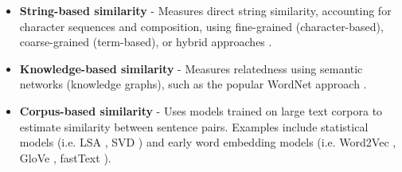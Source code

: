\documentclass[10pt,oneside]{report}
\begin{document}
\begin{itemize}
    \item \textbf{String-based similarity} - Measures direct string similarity, accounting for character sequences and composition, using fine-grained (character-based), coarse-grained (term-based), or hybrid approaches \cite{yu2016string}.
    \item \textbf{Knowledge-based similarity} - Measures relatedness using semantic networks (knowledge graphs), such as the popular WordNet approach \cite{budanitsky2001semantic}.
    \item \textbf{Corpus-based similarity} - Uses models trained on large text corpora to estimate similarity between sentence pairs. Examples include statistical models (i.e. LSA \cite{landauer1998introduction}, SVD \cite{steinberger2005text}) and early word embedding models (i.e. Word2Vec \cite{bojanowski2017enriching}, GloVe \cite{pennington2014glove}, fastText \cite{mikolov2013efficient}). %
\end{itemize}
\end{document}
